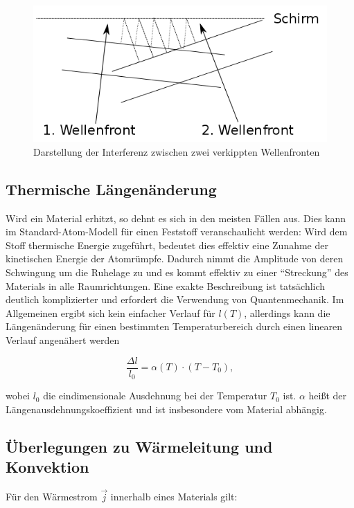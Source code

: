 \begin{figure}
\centering
        \includegraphics[width=.9\textwidth]{images/verkippung.png}
\caption{Darstellung der Interferenz zwischen zwei verkippten Wellenfronten}
\label{verkippung}
\end{figure}


\subsection{Thermische Längenänderung}
Wird ein Material erhitzt, so dehnt es sich in den meisten Fällen aus. Dies kann im Standard-Atom-Modell für einen Feststoff veranschaulicht werden: Wird dem Stoff thermische Energie zugeführt, bedeutet dies effektiv eine Zunahme der kinetischen Energie der Atomrümpfe. Dadurch nimmt die Amplitude von deren Schwingung um die Ruhelage zu und es kommt effektiv zu einer \enquote{Streckung} des Materials in alle Raumrichtungen. Eine exakte Beschreibung ist tatsächlich deutlich komplizierter und erfordert die Verwendung von Quantenmechanik. Im Allgemeinen ergibt sich kein einfacher Verlauf für $ l(T) $, allerdings kann die Längenänderung für einen bestimmten Temperaturbereich durch einen linearen Verlauf angenähert werden 

\begin{equation}
\frac{ \Delta l}{l_{0}} = \alpha(T) \cdot (T-T_{0}), 
\label{form:ausdehnung}
\end{equation}

wobei $ l_{0} $ die eindimensionale Ausdehnung bei der Temperatur $ T_{0} $ ist. $ \alpha $ heißt der Längenausdehnungskoeffizient und ist insbesondere vom Material abhängig. 

\subsection{Überlegungen zu Wärmeleitung und Konvektion}
Für den Wärmestrom $ \vec{j} $ innerhalb eines Materials gilt: 

